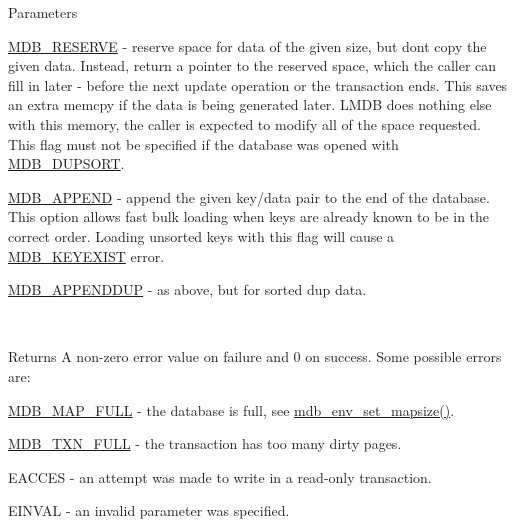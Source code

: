 \begin{DoxyParams}[1]{Parameters}
\begin{DoxyItemize}
\item \mbox{\hyperlink{group__mdb__put_gac0545c6aea719991e3eae6ccc686efcc}{M\+D\+B\+\_\+\+R\+E\+S\+E\+R\+VE}} -\/ reserve space for data of the given size, but don\textquotesingle{}t copy the given data. Instead, return a pointer to the reserved space, which the caller can fill in later -\/ before the next update operation or the transaction ends. This saves an extra memcpy if the data is being generated later. L\+M\+DB does nothing else with this memory, the caller is expected to modify all of the space requested. This flag must not be specified if the database was opened with \mbox{\hyperlink{group__mdb__dbi__open_gae0626566c2562e9007f5c8c9535bab1a}{M\+D\+B\+\_\+\+D\+U\+P\+S\+O\+RT}}. 
\item \mbox{\hyperlink{group__mdb__put_ga06af7a6e87588fd723e2dd1d7e580e6a}{M\+D\+B\+\_\+\+A\+P\+P\+E\+ND}} -\/ append the given key/data pair to the end of the database. This option allows fast bulk loading when keys are already known to be in the correct order. Loading unsorted keys with this flag will cause a \mbox{\hyperlink{group__errors_ga05dc5bbcc7da81a7345bd8676e8e0e3b}{M\+D\+B\+\_\+\+K\+E\+Y\+E\+X\+I\+ST}} error. 
\item \mbox{\hyperlink{group__mdb__put_ga0583fe408057ff1c03b8dd071c0d68d2}{M\+D\+B\+\_\+\+A\+P\+P\+E\+N\+D\+D\+UP}} -\/ as above, but for sorted dup data. 
\end{DoxyItemize}\\
\hline
\end{DoxyParams}
\begin{DoxyReturn}{Returns}
A non-\/zero error value on failure and 0 on success. Some possible errors are\+: 
\begin{DoxyItemize}
\item \mbox{\hyperlink{group__errors_ga0a83370402a060c9175100d4bbfb9f25}{M\+D\+B\+\_\+\+M\+A\+P\+\_\+\+F\+U\+LL}} -\/ the database is full, see \mbox{\hyperlink{group__mdb_ga4c47a5830f1071e578eaa1bbda2ae83e}{mdb\+\_\+env\+\_\+set\+\_\+mapsize()}}. 
\item \mbox{\hyperlink{group__errors_gacba5cdc8618093f59d0339e88e69570e}{M\+D\+B\+\_\+\+T\+X\+N\+\_\+\+F\+U\+LL}} -\/ the transaction has too many dirty pages. 
\item E\+A\+C\+C\+ES -\/ an attempt was made to write in a read-\/only transaction. 
\item E\+I\+N\+V\+AL -\/ an invalid parameter was specified. 
\end{DoxyItemize}
\end{DoxyReturn}


